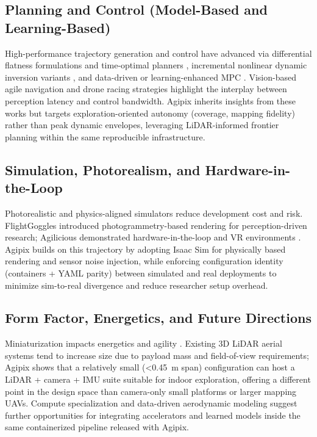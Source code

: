 \documentclass[letterpaper, 10 pt, conference]{ieeeconf}  %
\begin{document}
\subsection{Planning and Control (Model-Based and Learning-Based)}
High-performance trajectory generation and control have advanced via differential flatness formulations and time-optimal planners \cite{Foehn2021science}, incremental nonlinear dynamic inversion variants \cite{tal2020tcst,smeur2016jgcd}, and data-driven or learning-enhanced MPC \cite{torrente2021ral}. Vision-based agile navigation and drone racing strategies \cite{croonRAS20,Foehn2022Agilicious} highlight the interplay between perception latency and control bandwidth. Agipix inherits insights from these works but targets exploration-oriented autonomy (coverage, mapping fidelity) rather than peak dynamic envelopes, leveraging LiDAR-informed frontier planning within the same reproducible infrastructure.

\subsection{Simulation, Photorealism, and Hardware-in-the-Loop}
Photorealistic and physics-aligned simulators reduce development cost and risk. FlightGoggles \cite{guerra2019flightgoggles} introduced photogrammetry-based rendering for perception-driven research; Agilicious demonstrated hardware-in-the-loop and VR environments \cite{doi:10.1126/scirobotics.abl6259}. Agipix builds on this trajectory by adopting Isaac Sim for physically based rendering and sensor noise injection, while enforcing configuration identity (containers + YAML parity) between simulated and real deployments to minimize sim-to-real divergence and reduce researcher setup overhead.

\subsection{Form Factor, Energetics, and Future Directions}
Miniaturization impacts energetics and agility \cite{Floreano2015nature,Karydis2017if}. Existing 3D LiDAR aerial systems tend to increase size due to payload mass and field-of-view requirements; Agipix shows that a relatively small (<0.45~m span) configuration can host a LiDAR + camera + IMU suite suitable for indoor exploration, offering a different point in the design space than camera-only small platforms or larger mapping UAVs. Compute specialization \cite{Suleiman2019jssc} and data-driven aerodynamic modeling \cite{torrente2021ral} suggest further opportunities for integrating accelerators and learned models inside the same containerized pipeline released with Agipix.
\end{document}
